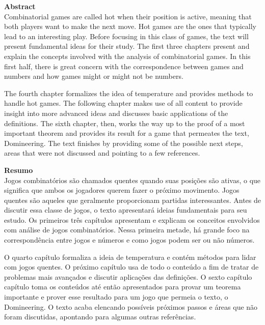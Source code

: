 \newpage

{
\noindent\Large\textbf{Abstract}
}\\


\noindent
Combinatorial games are called hot when their position is active, meaning that both players want to make the next move. Hot games are the ones that typically lead to an interesting play. Before focusing in this class of games, the text will present fundamental ideas for their study. The first three chapters present and explain the concepts involved with the analysis of combinatorial games. In this first half, there is great concern with the correspondence between games and numbers and how games might or might not be numbers.

The fourth chapter formalizes the idea of temperature and provides methods to handle hot games. The following chapter makes use of all content to provide insight into more advanced ideas and discusses basic applications of the definitions. The sixth chapter, then, works the way up to the proof of a most important theorem and provides its result for a game that permeates the text, Domineering. The text finishes by providing some of the possible next steps, areas that were not discussed and pointing to a few references.

\newpage

{
\noindent\Large\textbf{Resumo}
}\\


\noindent
Jogos combinatórios são chamados quentes quando suas posições são ativas, o que significa que ambos os jogadores querem fazer o próximo movimento. Jogos quentes são aqueles que geralmente proporcionam partidas interessantes. Antes de discutir essa classe de jogos, o texto apresentará ideias fundamentais para seu estudo. Os primeiros três capítulos apresentam e explicam os conceitos envolvidos com análise de jogos combinatórios. Nessa primeira metade, há grande foco na correspondência entre jogos e números e como jogos podem ser ou não números.


O quarto capítulo formaliza a ideia de temperatura e contém métodos para lidar com jogos quentes. O próximo capítulo usa de todo o conteúdo a fim de tratar de problemas mais avançados e discutir aplicações das definições. O sexto capítulo capítulo toma os conteúdos até então apresentados para provar um teorema importante e prover esse resultado para um jogo que permeia o texto, o Domineering. O texto acaba elencando possíveis próximos passos e áreas que não foram discutidas, apontando para algumas outras referências.
